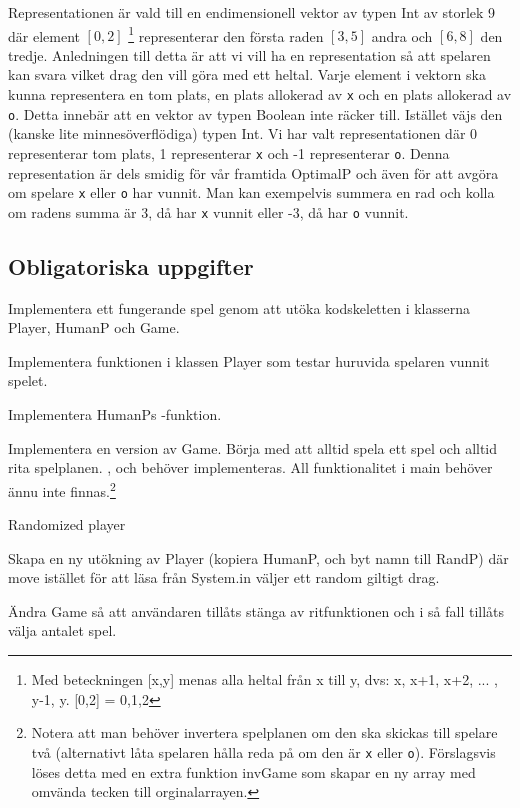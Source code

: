 Representationen är vald till en endimensionell vektor av typen Int av storlek 9 där element $[0,2]$ \footnote{Med beteckningen [x,y] menas alla heltal från x till y, dvs: x, x+1, x+2, ... , y-1, y. [0,2] = {0,1,2}} representerar den första raden $[3,5]$ andra och $[6,8]$ den tredje. Anledningen till detta är att vi vill ha en representation så att spelaren kan svara vilket drag den vill göra med ett heltal.
Varje element i vektorn ska kunna representera en tom plats, en plats allokerad av \texttt{x} och en plats allokerad av \texttt{o}. Detta innebär att en vektor av typen Boolean inte räcker till. Istället väjs den (kanske lite minnesöverflödiga) typen Int. Vi har valt representationen där 0 representerar tom plats, 1 representerar \texttt{x} och -1 representerar \texttt{o}. Denna representation är dels smidig för vår framtida OptimalP och även för att avgöra om spelare \texttt{x} eller \texttt{o} har vunnit. Man kan exempelvis summera en rad och kolla om radens summa är 3, då har \texttt{x} vunnit eller -3, då har \texttt{o} vunnit.
 
\subsection{Obligatoriska uppgifter}

\Task Implementera ett fungerande spel genom att utöka kodskeletten i klasserna Player, HumanP och Game.

\Subtask Implementera funktionen  i klassen Player som testar huruvida spelaren  vunnit spelet.

\Subtask Implementera HumanPs -funktion.

\Subtask Implementera en version av Game. Börja med att alltid spela ett spel och alltid rita spelplanen. ,  och  behöver implementeras. All funktionalitet i main behöver ännu inte finnas.\footnote{Notera att man behöver invertera spelplanen om den ska skickas till spelare två (alternativt låta spelaren hålla reda på om den är \texttt{x} eller \texttt{o}). Förslagsvis löses detta med en extra funktion invGame som skapar en ny array med omvända tecken till orginalarrayen.}

\Task Randomized player

\Subtask Skapa en ny utökning av Player (kopiera HumanP, och byt namn till RandP) där move istället för att läsa från System.in väljer ett random giltigt drag.

\Subtask Ändra Game så att användaren tillåts stänga av ritfunktionen och i så fall tillåts välja antalet spel.

